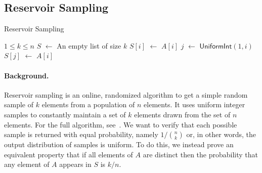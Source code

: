 \documentclass[acmsmall,review,anonymous]{acmart}\settopmatter{printfolios=true,printccs=false,printacmref=false}
\newcommand*\Let[2]{\State #1 $\gets$ #2}
\begin{document}

\subsection{Reservoir Sampling}
\label{sec:reservoir_sampling}

\begin{algorithm}
	\caption{Reservoir Sampling}
	\label{alg:reservoir_sampling}
	\begin{algorithmic}[1]
    \Require $1 \leq k \leq n$
    \Let{$S$}{An empty list of size $k$}
		\Let{$S[i]$}{$A[i]$}
		\EndFor
		\Let{$j$}{$\mathsf{UniformInt}(1,i)$}
		\Let{$S[j]$}{$A[i]$}
		\EndIf
		\EndFor
		\State{}
		\EndFunction
	\end{algorithmic}
\end{algorithm}

\paragraph*{Background.}
Reservoir sampling \citep{vitter_1985} is an online, randomized algorithm to get a simple random sample of $k$ elements from a population of $n$ elements.
% 
It uses uniform integer samples to constantly maintain a set of $k$ elements drawn from the set of $n$ elements.
% 
For the full algorithm, see~.
% 
We want to verify that each possible sample is returned with equal probability, namely $1/\binom{n}{k}$ or, in other words, the output distribution of samples is uniform.
% 
To do this, we instead prove an equivalent property that if all elements of $A$ are distinct then the probability that any element of $A$ appears in $S$ is $k/n$.
\end{document}
